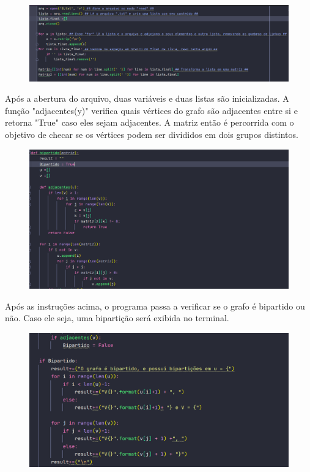 \documentclass{article}
\begin{document}
	\begin{figure}[H]
		\centering
		\includegraphics[width=0.6\linewidth]{"Figuras/Print1"}
		\label{fig:print1}
		\caption{}
	\end{figure}\vspace*{0.3cm}
	\newpage

		Após a abertura do arquivo, duas variáveis e duas listas são inicializadas. A função "adjacentes(y)" verifica quais vértices do grafo são adjacentes entre si e retorna "True" caso eles sejam adjacentes. A matriz então é percorrida com o objetivo de checar se os vértices podem ser divididos em dois grupos distintos.

	\begin{figure}[H]
		\centering
		\includegraphics[width=0.6\linewidth]{"Figuras/Print2"}
		\label{fig:print2}
		\caption{}
	\end{figure}\vspace*{0.3cm}
	
		Após as instruções acima, o programa passa a verificar se o grafo é bipartido ou não. Caso ele seja, uma bipartição será exibida no terminal.
	
	\begin{figure}[H]
		\centering
		\includegraphics[width=0.6\linewidth]{"Figuras/Print3"}
		\label{fig:print3}
		\caption{}
	\end{figure}\vspace*{0.3cm}
\end{document}
